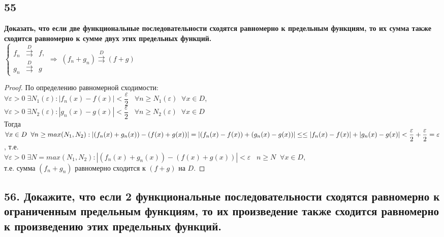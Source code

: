 \documentclass[a4paper, fleqn]{article}
\begin{document}
    \subsection*{55}
        \textbf{ Доказать, что если две функциональные последовательности сходятся равномерно к предельным функциям, то их сумма также сходится равномерно к сумме двух этих предельных функций.} \\[5 pt]
    $\left\{\begin{array}{lll} 
    f_n &\overset{D}{\rightrightarrows}& f, \\[5 pt]
    g_n &\overset{D}{\rightrightarrows}& g
    \end{array}\right. \Rightarrow \; (f_n + g_n) \overset{D}{\rightrightarrows} (f + g)$
    \begin{proof}
    По определению равномерной сходимости: \\[3 pt]
    $\forall \varepsilon > 0 \; \exists N_1(\varepsilon) : |f_n(x) - f(x)| < \dfrac{\varepsilon}2 \;\;\; \forall n \ge N_1(\varepsilon)\;\; \forall x \in D$, \\[3 pt]
    $\forall \varepsilon > 0 \; \exists N_2(\varepsilon) : |g_n(x) - g(x)| < \dfrac{\varepsilon}2 \;\;\; \forall n \ge N_2(\varepsilon)\;\; \forall x \in D$ \\[3 pt]
    Тогда \\[3 pt]
    $\forall x \in D \;\; \forall n \ge max(N_1, N_2) : |(f_n(x) + g_n(x)) - (f(x) + g(x))|  = |(f_n(x) - f(x)) + (g_n(x) - g(x))|  \le \\[3 pt]
    \le |f_n(x) - f(x)| + |g_n(x) - g(x)| < \dfrac{\varepsilon}2 + \dfrac{\varepsilon}2 = \varepsilon$, т.е. \\[3 pt]
    $\forall \varepsilon > 0 \; \exists N = max(N_1, N_2) : |(f_n(x) + g_n(x)) - (f(x) + g(x))| < \varepsilon \;\;\; n \ge N \;\; \forall x \in D$, \\[5 pt]
    т.е. сумма $(f_n + g_n)$ равномерно сходится к $(f + g)$ на $D$.
    \end{proof}    
    
    \subsection*{56. Докажите, что если 2 функциональные последовательности сходятся равномерно к ограниченным предельным функциям, то их произведение также сходится равномерно к произведению этих предельных функций.}
        
\end{document}
